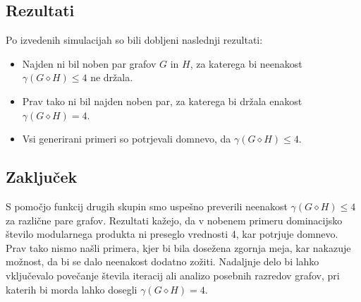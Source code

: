 \documentclass[a4paper,12pt]{article}
\theoremstyle{definition}
\begin{document}
\subsection{Rezultati}
Po izvedenih simulacijah so bili dobljeni naslednji rezultati:
\begin{itemize}
    \item Najden ni bil noben par grafov $G$ in $H$, za katerega bi neenakost $\gamma(G \diamond H) \leq 4$ ne držala.
    \item Prav tako ni bil najden noben par, za katerega bi držala enakost $\gamma(G \diamond H) = 4$.
    \item Vsi generirani primeri so potrjevali domnevo, da $\gamma(G \diamond H) \leq 4$.
\end{itemize}

\subsection{Zaključek}
S pomočjo funkcij drugih skupin smo uspešno preverili neenakost $\gamma(G \diamond H) \leq 4$ za različne pare grafov. Rezultati kažejo, da v nobenem primeru dominacijsko število modularnega produkta ni preseglo vrednosti 4, kar potrjuje domnevo. Prav tako nismo našli primera, kjer bi bila dosežena zgornja meja, kar nakazuje možnost, da bi se dalo neenakost dodatno zožiti. Nadaljnje delo bi lahko vključevalo povečanje števila iteracij ali analizo posebnih razredov grafov, pri katerih bi morda lahko dosegli $\gamma(G \diamond H) = 4$.

%
%
\end{document}

